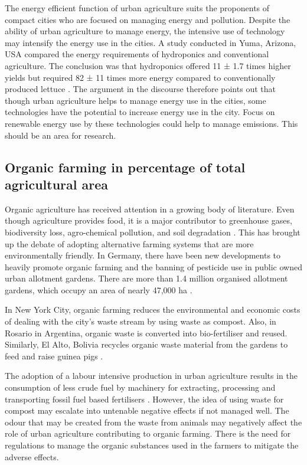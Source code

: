 The energy efficient function of urban agriculture suits the proponents of compact cities who are focused on managing energy and pollution. Despite the ability of urban agriculture to manage energy, the intensive use of technology may intensify the energy use in the cities. A study conducted in Yuma, Arizona, USA compared the energy requirements of hydroponics and conventional agriculture. The conclusion was that hydroponics offered 11 ± 1.7 times higher yields but required 82 ± 11 times more energy compared to conventionally produced lettuce \cite{Barbosa2015}. The argument in the discourse therefore points out that though urban agriculture helps to manage energy use in the cities, some technologies have the potential to increase energy use in the city. Focus on renewable energy use by these technologies could help to manage emissions. This should be an area for research.

\subsection{Organic farming in percentage of total agricultural area}

Organic agriculture has received attention in a growing body of literature. Even though agriculture provides food, it is a major contributor to greenhouse gases, biodiversity loss, agro-chemical pollution, and soil degradation \cite{Crowder2015}. This has brought up the debate of adopting alternative farming systems that are more environmentally friendly. In Germany, there have been new developments to heavily promote organic farming and the banning of pesticide use in public owned urban allotment gardens. There are more than 1.4 million organised allotment gardens, which occupy an area of nearly 47,000 ha \cite{Hoornweg2012}.

In New York City, organic farming reduces the environmental and economic costs of dealing with the city's waste stream by using waste as compost. Also, in Rosario in Argentina, organic waste is converted into bio-fertiliser and reused. Similarly, El Alto, Bolivia recycles organic waste material from the gardens to feed and raise guinea pigs \cite{Hoornweg2012}.

The adoption of a labour intensive production in urban agriculture results in the consumption of less crude fuel by machinery for extracting, processing and transporting fossil fuel based fertilisers \cite{Cruse2010}. However, the idea of using waste for compost may escalate into untenable negative effects if not managed well. The odour that may be created from the waste from animals \cite{Hallett2016} may negatively affect the role of urban agriculture contributing to organic farming. There is the need for regulations to manage the organic substances used in the farmers to mitigate the adverse effects.

